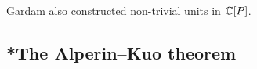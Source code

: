 Gardam also constructed non-trivial units in $\mathbb{C}[P]$. 








\subsection{*The Alperin--Kuo theorem}



